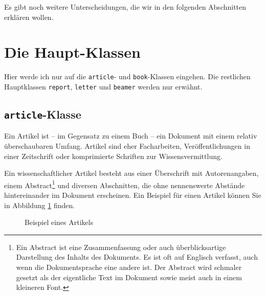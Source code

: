 Es gibt noch weitere Unterscheidungen, die wir in den folgenden Abschnitten erklären wollen.

\section{Die Haupt-Klassen}

Hier werde ich nur auf die \texttt{article}- und \texttt{book}-Klassen eingehen. Die restlichen Hauptklassen \texttt{report}, \texttt{letter} und \texttt{beamer} werden nur erwähnt.

\subsection{\texttt{article}-Klasse}

Ein Artikel ist -- im Gegensatz zu einem Buch -- ein Dokument mit einem relativ überschaubaren Umfang. Artikel sind eher Facharbeiten, Veröffentlichungen in einer Zeitschrift oder komprimierte Schriften zur Wissensvermittlung. 

Ein wissenschaftlicher Artikel besteht aus einer Überschrift mit Autorenangaben, einem Abstract\footnote{Ein Abstract ist eine Zusammenfassung oder auch überblicksartige Darstellung des Inhalts des Dokuments. Es ist oft auf Englisch verfasst, auch wenn die Dokumentsprache eine andere ist. Der Abstract wird schmaler gesetzt als der eigentliche Text im Dokument sowie meist auch in einem kleineren Font.} und diversen Abschnitten, die ohne nennenswerte Abstände hintereinander im Dokument erscheinen. Ein Beispiel für einen Artikel können Sie in Abbildung \ref{fig:article} finden. 

\begin{figure}[p]
\centering
{}
\caption{Beispiel eines Artikels}
\label{fig:article}
\end{figure}

